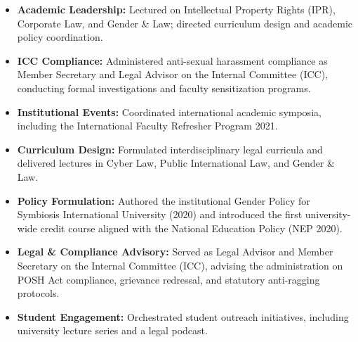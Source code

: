 \begin{itemize}[leftmargin=*, noitemsep]
    \item \textbf{Academic Leadership:} Lectured on Intellectual Property Rights (IPR), Corporate Law, and Gender \& Law; directed curriculum design and academic policy coordination.
    \item \textbf{ICC Compliance:} Administered anti-sexual harassment compliance as Member Secretary and Legal Advisor on the Internal Committee (ICC), conducting formal investigations and faculty sensitization programs.
    \item \textbf{Institutional Events:} Coordinated international academic symposia, including the International Faculty Refresher Program 2021.
\end{itemize}

\vspace{6pt}

\begin{itemize}[leftmargin=*, noitemsep]
    \item \textbf{Curriculum Design:} Formulated interdisciplinary legal curricula and delivered lectures in Cyber Law, Public International Law, and Gender \& Law.
    \item \textbf{Policy Formulation:} Authored the institutional Gender Policy for Symbiosis International University (2020) and introduced the first university-wide credit course aligned with the National Education Policy (NEP 2020).
    \item \textbf{Legal \& Compliance Advisory:} Served as Legal Advisor and Member Secretary on the Internal Committee (ICC), advising the administration on POSH Act compliance, grievance redressal, and statutory anti-ragging protocols.
    \item \textbf{Student Engagement:} Orchestrated student outreach initiatives, including university lecture series and a legal podcast.
\end{itemize}

